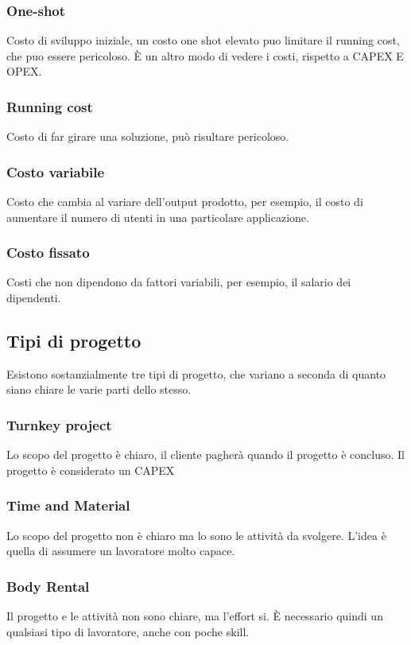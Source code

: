 \subsubsection{One-shot}
Costo di sviluppo iniziale, un costo one shot elevato puo limitare il running cost, 
che puo essere pericoloso.
È un altro modo di vedere i costi, rispetto a CAPEX E OPEX.

\subsubsection{Running cost}
Costo di far girare una soluzione, può risultare pericoloso.

\subsubsection{Costo variabile}
Costo che cambia al variare dell'output prodotto, per esempio, 
il costo di aumentare il numero di utenti in una particolare applicazione.

\subsubsection{Costo fissato}
Costi che non dipendono da fattori variabili, per esempio, il salario dei dipendenti.

\subsection{Tipi di progetto}
Esistono sostanzialmente tre tipi di progetto, che variano a seconda di quanto
siano chiare le varie parti dello stesso.

\subsubsection{Turnkey project}
Lo scopo del progetto è chiaro, il cliente pagherà quando il progetto è 
concluso. Il progetto è considerato un CAPEX

\subsubsection{Time and Material}
Lo scopo del progetto non è chiaro ma lo sono le attività da svolgere.
L'idea è quella di assumere un lavoratore molto capace.

\subsubsection{Body Rental}
Il progetto e le attività non sono chiare, ma l'effort si.
È necessario quindi un qualsiasi tipo di lavoratore, anche con poche skill.

